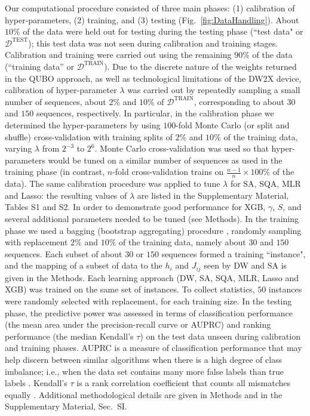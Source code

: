 \documentclass[aps,pra,groupedaddress,nofootinbib,notitlepage,showpacs,floatfix,superscriptaddress]{revtex4-1}
\begin{document}
Our computational procedure consisted of three main phases: (1) calibration of hyper-parameters, (2) training, and (3) testing (Fig.~\ref{fig:DataHandling}). About $10\%$ of the data were held out for testing during the testing phase (``test data" or $\mathcal{D}^\textrm{TEST}$); this test data was not seen during calibration and training stages. Calibration and training were carried out using the remaining $90\%$ of the data (``training data'' or $\mathcal{D}^\textrm{TRAIN}$). Due to the discrete nature of the weights returned in the QUBO approach, as well as technological limitations of the DW2X device, calibration of hyper-parameter $\lambda$ was carried out by repeatedly sampling a small number of sequences, about $2\%$ and $10\%$ of $\mathcal{D}^\textrm{TRAIN}$, corresponding to about $30$ and $150$ sequences, respectively. In particular, in the calibration phase we determined the hyper-parameters by using $100$-fold Monte Carlo (or split and shuffle) cross-validation with training splits of $2\%$ and $10\%$ of the training data, varying $\lambda$ from $2^{-3}$ to $2^{6}$. Monte Carlo cross-validation was used so that hyper-parameters would be tuned on a similar number of sequences as used in the training phase (in contrast, $n$-fold cross-validation trains on $\frac{n-1}{n}\times 100\%$ of the data). The same calibration procedure was applied to tune $\lambda$ for SA, SQA, MLR and Lasso: the resulting values of $\lambda$ are listed in the Supplementary Material, Tables S1 and S2. In order to demonstrate good performance for XGB, $\gamma$, $S$, and several additional parameters needed to be tuned (see Methods). In the training phase we used a bagging (bootstrap aggregating) procedure \cite{Breiman:96}, randomly sampling with replacement $2\%$ and $10\%$ of the training data, namely about $30$ and $150$ sequences. Each subset of about $30$ or $150$ sequences formed a training ``instance", and the mapping of a subset of data to the $h_i$ and $J_{ij}$ seen by DW and SA is given in the Methods. Each learning approach (DW, SA, SQA, MLR, Lasso and XGB) was trained on the same set of instances. To collect statistics, $50$ instances were randomly selected with replacement, for each training size. In the testing phase, the predictive power was assessed in terms of classification performance (the mean area under the precision-recall curve or AUPRC) and ranking performance (the median Kendall's $\tau$) on the test data unseen during calibration and training phases. AUPRC is a measure of classification performance that may help discern between similar algorithms when there is a high degree of class imbalance; i.e., when the data set contains many more false labels than true labels \cite{Davis:06}. Kendall's $\tau$ is a rank correlation coefficient that counts all mismatches equally \cite{Kendall:08}. Additional methodological details are given in Methods and in the Supplementary Material, Sec.~SI.
\end{document}
